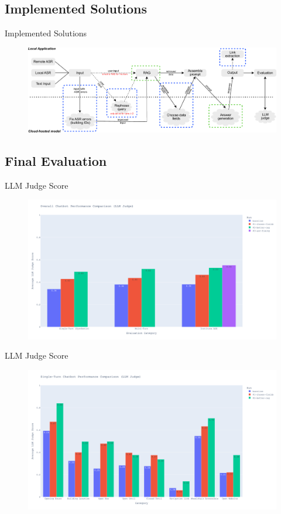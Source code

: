 \documentclass{sdqbeamer}[smallfoot]
\begin{document}
\subsection{Implemented Solutions}
\begin{frame}[t]{Implemented Solutions}
    \vspace{-0.5cm}
	\begin{figure}
	    \centering
	    \includegraphics[width=1.0\linewidth]{images/data_flow_phase_3.pdf}
	\end{figure}
\end{frame}

\subsection{Final Evaluation}
\begin{frame}[t]{LLM Judge Score}
	\vspace{-1.5cm}
	\begin{figure}
	    \centering
	    \includegraphics[width=0.75\linewidth]{images/overall_performance_comparison.png}
	\end{figure}
\end{frame}

\begin{frame}[t]{LLM Judge Score}
	\vspace{-1.5cm}
	\begin{figure}
	    \centering
	    \includegraphics[width=0.75\linewidth]{images/single_turn_performance_comparison.png}
	\end{figure}
\end{frame}
\end{document}
